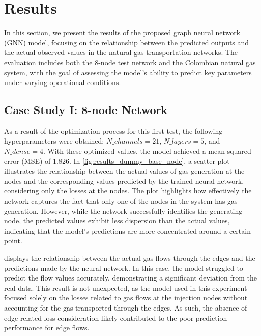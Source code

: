 \section{Results}

In this section, we present the results of the proposed graph neural network (GNN) model, focusing on the relationship between the predicted outputs and the actual observed values in the natural gas transportation networks. The evaluation includes both the 8-node test network and the Colombian natural gas system, with the goal of assessing the model's ability to predict key parameters under varying operational conditions. 


%
%     
%

\subsection{Case Study I: 8-node Network}


As a result of the optimization process for this first test, the following hyperparameters were obtained: $N\_channels=21$, $N\_layers=5$, and $N\_dense=4$. With these optimized values, the model achieved a mean squared error (MSE) of 1.826. In \cref{fig:results_dummy_base_node}, a scatter plot illustrates the relationship between the actual values of gas generation at the nodes and the corresponding values predicted by the trained neural network, considering only the losses at the nodes. The plot highlights how effectively the network captures the fact that only one of the nodes in the system has gas generation. However, while the network successfully identifies the generating node, the predicted values exhibit less dispersion than the actual values, indicating that the model's predictions are more concentrated around a certain point.


 displays the relationship between the actual gas flows through the edges and the predictions made by the neural network. In this case, the model struggled to predict the flow values accurately, demonstrating a significant deviation from the real data. This result is not unexpected, as the model used in this experiment focused solely on the losses related to gas flows at the injection nodes without accounting for the gas transported through the edges. As such, the absence of edge-related loss consideration likely contributed to the poor prediction performance for edge flows.



